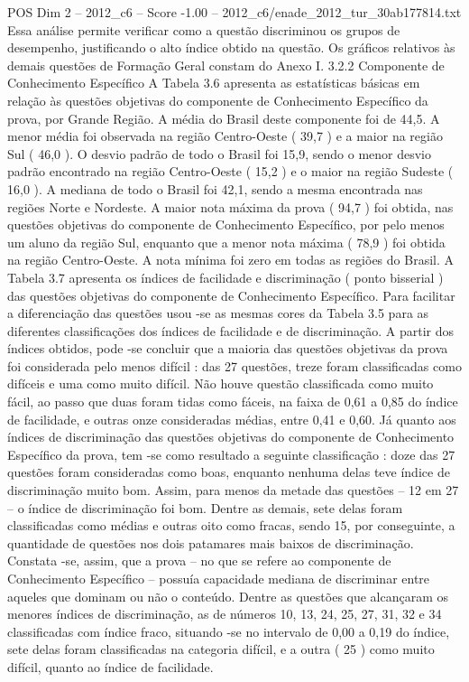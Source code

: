 \begin{textsample}{POS Dim 2 – 2012\_c6 – Score -1.00 – 2012\_c6/enade\_2012\_tur\_30ab177814.txt}
Essa análise permite verificar como a questão discriminou os grupos de desempenho, justificando o alto índice obtido na questão.
Os gráficos relativos às demais questões de Formação Geral constam do Anexo I. 3.2.2 Componente de Conhecimento Específico A Tabela 3.6 apresenta as estatísticas básicas em relação às questões objetivas do componente de Conhecimento Específico da prova, por Grande Região.
A média do Brasil deste componente foi de 44,5.
A menor média foi observada na região Centro-Oeste ( 39,7 ) e a maior na região Sul ( 46,0 ).
O desvio padrão de todo o Brasil foi 15,9, sendo o menor desvio padrão encontrado na região Centro-Oeste ( 15,2 ) e o maior na região Sudeste ( 16,0 ).
A mediana de todo o Brasil foi 42,1, sendo a mesma encontrada nas regiões Norte e Nordeste.
A maior nota máxima da prova ( 94,7 ) foi obtida, nas questões objetivas do componente de Conhecimento Específico, por pelo menos um aluno da região Sul, enquanto que a menor nota máxima ( 78,9 ) foi obtida na região Centro-Oeste.
A nota mínima foi zero em todas as regiões do Brasil.
A Tabela 3.7 apresenta os índices de facilidade e discriminação ( ponto bisserial ) das questões objetivas do componente de Conhecimento Específico.
Para facilitar a diferenciação das questões usou -se as mesmas cores da Tabela 3.5 para as diferentes classificações dos índices de facilidade e de discriminação.
A partir dos índices obtidos, pode -se concluir que a maioria das questões objetivas da prova foi considerada pelo menos difícil : das 27 questões, treze foram classificadas como difíceis e uma como muito difícil.
Não houve questão classificada como muito fácil, ao passo que duas foram tidas como fáceis, na faixa de 0,61 a 0,85 do índice de facilidade, e outras onze consideradas médias, entre 0,41 e 0,60.
Já quanto aos índices de discriminação das questões objetivas do componente de Conhecimento Específico da prova, tem -se como resultado a seguinte classificação : doze das 27 questões foram consideradas como boas, enquanto nenhuma delas teve índice de discriminação muito bom.
Assim, para menos da metade das questões – 12 em 27 – o índice de discriminação foi bom.
Dentre as demais, sete delas foram classificadas como médias e outras oito como fracas, sendo 15, por conseguinte, a quantidade de questões nos dois patamares mais baixos de discriminação.
Constata -se, assim, que a prova – no que se refere ao componente de Conhecimento Específico – possuía capacidade mediana de discriminar entre aqueles que dominam ou não o conteúdo.
Dentre as questões que alcançaram os menores índices de discriminação, as de números 10, 13, 24, 25, 27, 31, 32 e 34 classificadas com índice fraco, situando -se no intervalo de 0,00 a 0,19 do índice, sete delas foram classificadas na categoria difícil, e a outra ( 25 ) como muito difícil, quanto ao índice de facilidade.

\end{textsample}
